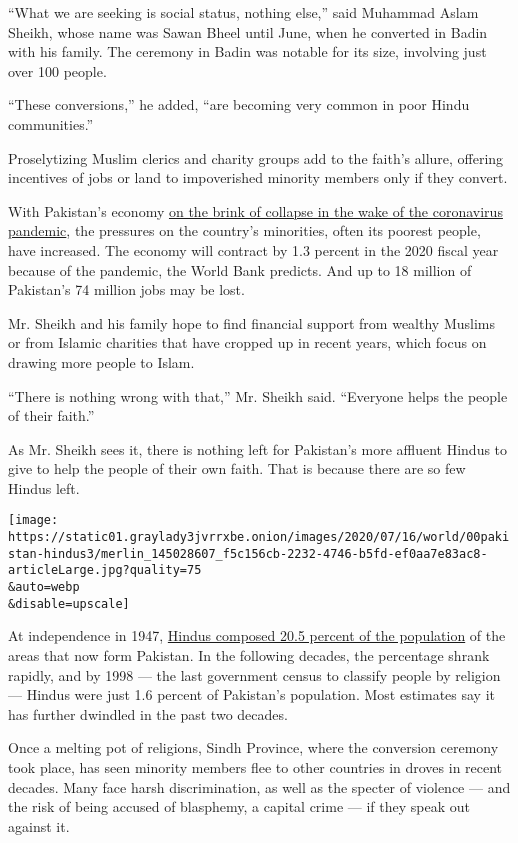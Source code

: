 ``What we are seeking is social status, nothing else,'' said Muhammad
Aslam Sheikh, whose name was Sawan Bheel until June, when he converted
in Badin with his family. The ceremony in Badin was notable for its
size, involving just over 100 people.

``These conversions,'' he added, ``are becoming very common in poor
Hindu communities.''

Proselytizing Muslim clerics and charity groups add to the faith's
allure, offering incentives of jobs or land to impoverished minority
members only if they convert.

With Pakistan's economy
\href{https://www.nytimes3xbfgragh.onion/2020/06/15/world/asia/pakistan-coronavirus-hospitals.html}{on
the brink of collapse in the wake of the coronavirus pandemic}, the
pressures on the country's minorities, often its poorest people, have
increased. The economy will contract by 1.3 percent in the 2020 fiscal
year because of the pandemic, the World Bank predicts. And up to 18
million of Pakistan's 74 million jobs may be lost.

Mr. Sheikh and his family hope to find financial support from wealthy
Muslims or from Islamic charities that have cropped up in recent years,
which focus on drawing more people to Islam.

``There is nothing wrong with that,'' Mr. Sheikh said. ``Everyone helps
the people of their faith.''

As Mr. Sheikh sees it, there is nothing left for Pakistan's more
affluent Hindus to give to help the people of their own faith. That is
because there are so few Hindus left.

\texttt{[image: https://static01.graylady3jvrrxbe.onion/images/2020/07/16/world/00pakistan-hindus3/merlin\_145028607\_f5c156cb-2232-4746-b5fd-ef0aa7e83ac8-articleLarge.jpg?quality=75\\\&auto=webp\\\&disable=upscale]}

At independence in 1947,
\href{https://theprint.in/opinion/modi-critics-decry-india-mistreating-minorities-but-cant-whitewash-pak-islamisation/355536/}{Hindus
composed 20.5 percent of the population} of the areas that now form
Pakistan. In the following decades, the percentage shrank rapidly, and
by 1998 --- the last government census to classify people by religion
--- Hindus were just 1.6 percent of Pakistan's population. Most
estimates say it has further dwindled in the past two decades.

Once a melting pot of religions, Sindh Province, where the conversion
ceremony took place, has seen minority members flee to other countries
in droves in recent decades. Many face harsh discrimination, as well as
the specter of violence --- and the risk of being accused of blasphemy,
a capital crime --- if they speak out against it.

